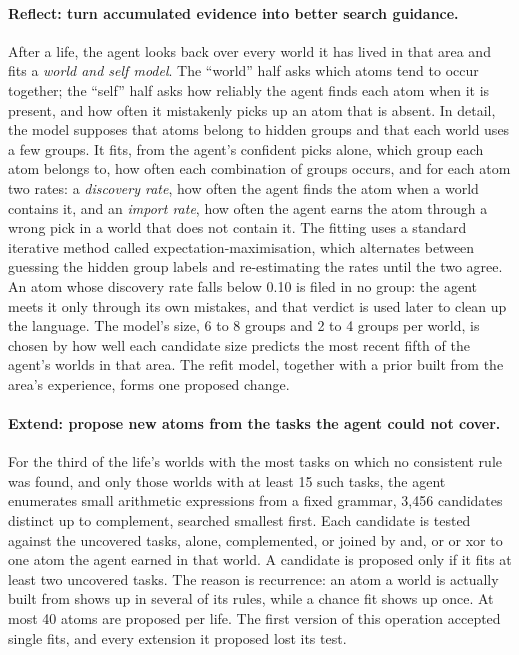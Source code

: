 \documentclass[11pt]{article}
\begin{document}
\paragraph{Reflect: turn accumulated evidence into better search guidance.} After a life, the agent looks back over every world it has lived in that area and fits a \emph{world and self model}. The ``world'' half asks which atoms tend to occur together; the ``self'' half asks how reliably the agent finds each atom when it is present, and how often it mistakenly picks up an atom that is absent. In detail, the model supposes that atoms belong to hidden groups and that each world uses a few groups. It fits, from the agent's confident picks alone, which group each atom belongs to, how often each combination of groups occurs, and for each atom two rates: a \emph{discovery rate}, how often the agent finds the atom when a world contains it, and an \emph{import rate}, how often the agent earns the atom through a wrong pick in a world that does not contain it. The fitting uses a standard iterative method called expectation-maximisation, which alternates between guessing the hidden group labels and re-estimating the rates until the two agree. An atom whose discovery rate falls below 0.10 is filed in no group: the agent meets it only through its own mistakes, and that verdict is used later to clean up the language. The model's size, 6 to 8 groups and 2 to 4 groups per world, is chosen by how well each candidate size predicts the most recent fifth of the agent's worlds in that area. The refit model, together with a prior built from the area's experience, forms one proposed change.

\paragraph{Extend: propose new atoms from the tasks the agent could not cover.} For the third of the life's worlds with the most tasks on which no consistent rule was found, and only those worlds with at least 15 such tasks, the agent enumerates small arithmetic expressions from a fixed grammar, 3,456 candidates distinct up to complement, searched smallest first. Each candidate is tested against the uncovered tasks, alone, complemented, or joined by and, or or xor to one atom the agent earned in that world. A candidate is proposed only if it fits at least two uncovered tasks. The reason is recurrence: an atom a world is actually built from shows up in several of its rules, while a chance fit shows up once. At most 40 atoms are proposed per life. The first version of this operation accepted single fits, and every extension it proposed lost its test.
\end{document}
